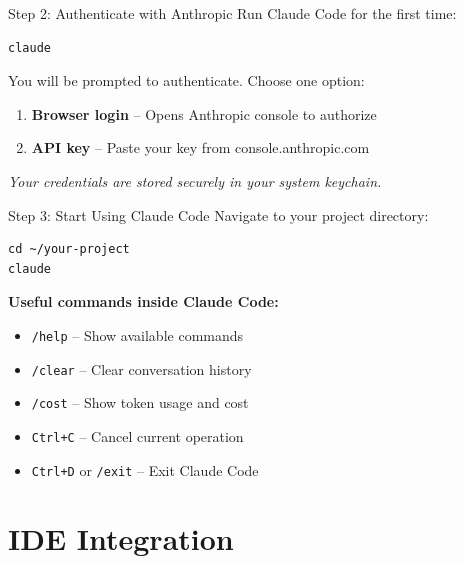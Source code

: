 \documentclass{beamer}
\begin{document}
\begin{frame}[fragile]{Step 2: Authenticate with Anthropic}
    Run Claude Code for the first time:
    \vspace{0.3cm}

\begin{lstlisting}
claude
\end{lstlisting}

    \vspace{0.3cm}
    You will be prompted to authenticate. Choose one option:

    \vspace{0.3cm}
    \begin{enumerate}
        \item \textbf{Browser login} -- Opens Anthropic console to authorize
        \item \textbf{API key} -- Paste your key from console.anthropic.com
    \end{enumerate}

    \vspace{0.3cm}
    \textit{Your credentials are stored securely in your system keychain.}
\end{frame}

\begin{frame}[fragile]{Step 3: Start Using Claude Code}
    Navigate to your project directory:
    \vspace{0.3cm}

\begin{lstlisting}
cd ~/your-project
claude
\end{lstlisting}

    \vspace{0.3cm}
    \textbf{Useful commands inside Claude Code:}
    \begin{itemize}
        \item \texttt{/help} -- Show available commands
        \item \texttt{/clear} -- Clear conversation history
        \item \texttt{/cost} -- Show token usage and cost
        \item \texttt{Ctrl+C} -- Cancel current operation
        \item \texttt{Ctrl+D} or \texttt{/exit} -- Exit Claude Code
    \end{itemize}
\end{frame}

\section{IDE Integration}
\end{document}
